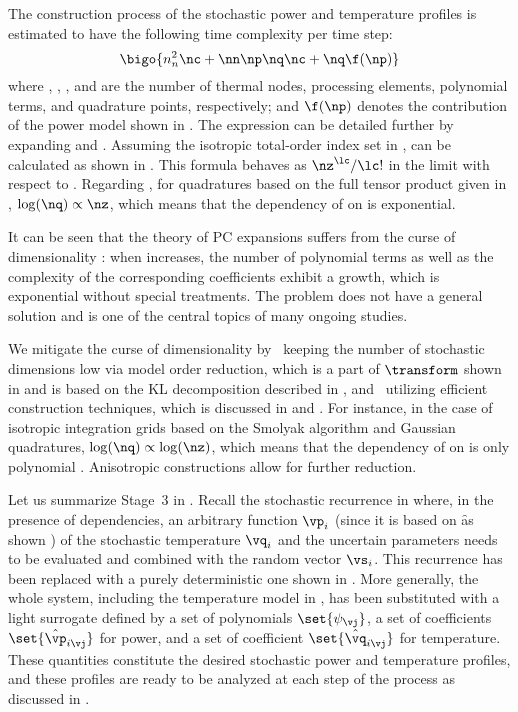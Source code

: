 The construction process of the stochastic power and temperature profiles is
estimated to have the following time complexity per time step:
\[
  \bigo{n_n^2 \nc + \nn \np \nq \nc + \nq \f(\np)}
\]
where \nn, \np, \nc, and \nq are the number of thermal nodes, processing
elements, polynomial terms, and quadrature points, respectively; and $\f(\np)$
denotes the contribution of the power model shown in .
The expression can be detailed further by expanding \nc and \nq. Assuming the
isotropic total-order index set in , \nc can
be calculated as shown in . This
formula behaves as $\nz^\lc / \lc!$ in the limit with respect to \nz. Regarding
\nq, for quadratures based on the full tensor product given in
, $\log(\nq) \propto \nz$, which means that the
dependency of \nq on \nz is exponential.

It can be seen that the theory of \ac{PC} expansions suffers from the curse of
dimensionality \cite{eldred2008, xiu2010}: when \nz increases, the number of
polynomial terms as well as the complexity of the corresponding coefficients
exhibit a growth, which is exponential without special treatments. The problem
does not have a general solution and is one of the central topics of many
ongoing studies.

We mitigate the curse of dimensionality by \one~keeping the number of stochastic
dimensions low via model order reduction, which is a part of $\transform$ shown
in  and is based on the \ac{KL} decomposition
described in , and \two~utilizing efficient
construction techniques, which is discussed in  and
. For instance, in the case of isotropic integration
grids based on the Smolyak algorithm and Gaussian quadratures, $\log(\nq)
\propto \log(\nz)$, which means that the dependency of \nq on \nz is only
polynomial \cite{heiss2008}. Anisotropic constructions allow for further
reduction.

Let us summarize Stage~3 in . Recall the stochastic
recurrence in  where, in the presence of
dependencies, an arbitrary function $\vp_i$ (since it is based on \f as shown
) of the stochastic temperature $\vq_i$ and the
uncertain parameters \vu needs to be evaluated and combined with the random
vector $\vs_i$. This recurrence has been replaced with a purely deterministic
one shown in . More generally, the whole system,
including the temperature model in , has been
substituted with a light surrogate defined by a set of polynomials
$\set{\psi_{\vj}}$, a set of coefficients $\set{\hat{\vp}_{i \vj}}$ for power,
and a set of coefficient $\set{\hat{\vq}_{i \vj}}$ for temperature. These
quantities constitute the desired stochastic power and temperature profiles, and
these profiles are ready to be analyzed at each step of the process as discussed
in .

